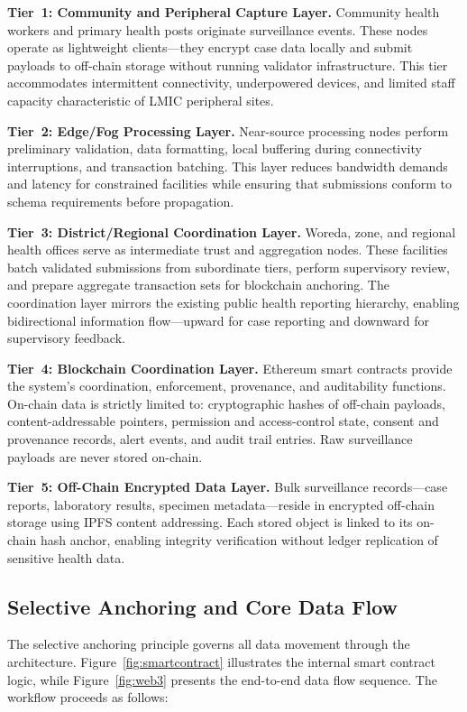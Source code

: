 \textbf{Tier~1: Community and Peripheral Capture Layer.} Community health workers and primary health posts originate surveillance events. These nodes operate as lightweight clients---they encrypt case data locally and submit payloads to off-chain storage without running validator infrastructure. This tier accommodates intermittent connectivity, underpowered devices, and limited staff capacity characteristic of LMIC peripheral sites.

\textbf{Tier~2: Edge/Fog Processing Layer.} Near-source processing nodes perform preliminary validation, data formatting, local buffering during connectivity interruptions, and transaction batching. This layer reduces bandwidth demands and latency for constrained facilities while ensuring that submissions conform to schema requirements before propagation.

\textbf{Tier~3: District/Regional Coordination Layer.} Woreda, zone, and regional health offices serve as intermediate trust and aggregation nodes. These facilities batch validated submissions from subordinate tiers, perform supervisory review, and prepare aggregate transaction sets for blockchain anchoring. The coordination layer mirrors the existing public health reporting hierarchy, enabling bidirectional information flow---upward for case reporting and downward for supervisory feedback.

\textbf{Tier~4: Blockchain Coordination Layer.} Ethereum smart contracts provide the system's coordination, enforcement, provenance, and auditability functions. On-chain data is strictly limited to: cryptographic hashes of off-chain payloads, content-addressable pointers, permission and access-control state, consent and provenance records, alert events, and audit trail entries. Raw surveillance payloads are never stored on-chain.

\textbf{Tier~5: Off-Chain Encrypted Data Layer.} Bulk surveillance records---case reports, laboratory results, specimen metadata---reside in encrypted off-chain storage using IPFS content addressing. Each stored object is linked to its on-chain hash anchor, enabling integrity verification without ledger replication of sensitive health data.

\subsection{Selective Anchoring and Core Data Flow}\label{subsec:dataflow}

The selective anchoring principle governs all data movement through the architecture. Figure~\ref{fig:smartcontract} illustrates the internal smart contract logic, while Figure~\ref{fig:web3} presents the end-to-end data flow sequence. The workflow proceeds as follows:

